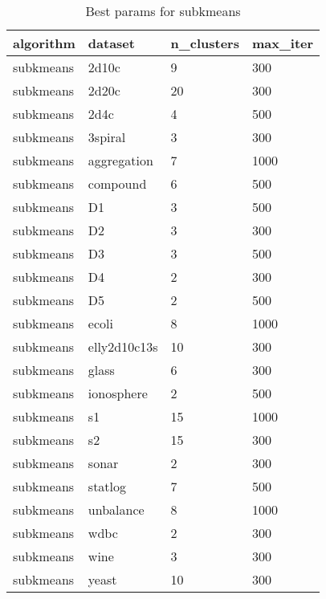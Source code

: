 \clearpage

\begin{table}[H]
\centering
\caption{Best params for subkmeans}
\label{S45_Table}
\begin{tabular}{|l|l|l|l|}
\hline
algorithm & dataset & n\_clusters & max\_iter \\
\hline
subkmeans & 2d10c & 9 & 300 \\
\hline
subkmeans & 2d20c & 20 & 300 \\
\hline
subkmeans & 2d4c & 4 & 500 \\
\hline
subkmeans & 3spiral & 3 & 300 \\
\hline
subkmeans & aggregation & 7 & 1000 \\
\hline
subkmeans & compound & 6 & 500 \\
\hline
subkmeans & D1 & 3 & 500 \\
\hline
subkmeans & D2 & 3 & 300 \\
\hline
subkmeans & D3 & 3 & 500 \\
\hline
subkmeans & D4 & 2 & 300 \\
\hline
subkmeans & D5 & 2 & 500 \\
\hline
subkmeans & ecoli & 8 & 1000 \\
\hline
subkmeans & elly2d10c13s & 10 & 300 \\
\hline
subkmeans & glass & 6 & 300 \\
\hline
subkmeans & ionosphere & 2 & 500 \\
\hline
subkmeans & s1 & 15 & 1000 \\
\hline
subkmeans & s2 & 15 & 300 \\
\hline
subkmeans & sonar & 2 & 300 \\
\hline
subkmeans & statlog & 7 & 500 \\
\hline
subkmeans & unbalance & 8 & 1000 \\
\hline
subkmeans & wdbc & 2 & 300 \\
\hline
subkmeans & wine & 3 & 300 \\
\hline
subkmeans & yeast & 10 & 300 \\
\hline
\end{tabular}
\end{table}

\clearpage

